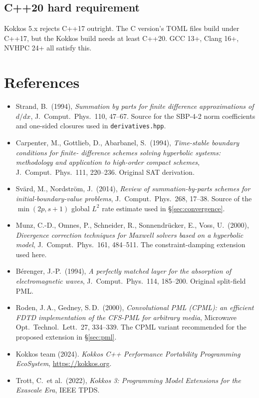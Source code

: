 \documentclass[11pt]{article}
\begin{document}
\subsection{C++20 hard requirement}

Kokkos 5.x rejects C++17 outright.  The C version's TOML files
build under C++17, but the Kokkos build needs at least C++20.
GCC 13+, Clang 16+, NVHPC 24+ all satisfy this.

\section*{References}

\begin{itemize}[itemsep=2pt,topsep=2pt]
  \item Strand, B.\ (1994), \emph{Summation by parts for finite
        difference approximations of $d/dx$}, J.\ Comput.\ Phys.\
        110, 47--67.  Source for the SBP-4-2 norm coefficients
        and one-sided closures used in \texttt{derivatives.hpp}.
  \item Carpenter, M., Gottlieb, D., Abarbanel, S.\ (1994),
        \emph{Time-stable boundary conditions for finite-
        difference schemes solving hyperbolic systems: methodology
        and application to high-order compact schemes},
        J.\ Comput.\ Phys.\ 111, 220--236.  Original SAT
        derivation.
  \item Svärd, M., Nordström, J.\ (2014), \emph{Review of
        summation-by-parts schemes for initial-boundary-value
        problems}, J.\ Comput.\ Phys.\ 268, 17--38.  Source of the
        $\min(2p, s+1)$ global $L^2$ rate estimate used in
        \S\ref{sec:convergence}.
  \item Munz, C.-D., Omnes, P., Schneider, R., Sonnendrücker, E.,
        Voss, U.\ (2000), \emph{Divergence correction techniques
        for Maxwell solvers based on a hyperbolic model},
        J.\ Comput.\ Phys.\ 161, 484--511.  The constraint-damping
        extension used here.
  \item Bérenger, J.-P.\ (1994), \emph{A perfectly matched layer
        for the absorption of electromagnetic waves},
        J.\ Comput.\ Phys.\ 114, 185--200.  Original split-field
        PML.
  \item Roden, J.\,A., Gedney, S.\,D.\ (2000), \emph{Convolutional
        PML (CPML): an efficient FDTD implementation of the
        CFS-PML for arbitrary media},
        Microwave Opt.\ Technol.\ Lett.\ 27, 334--339.  The CPML
        variant recommended for the proposed extension in
        \S\ref{sec:pml}.
  \item Kokkos team (2024). \emph{Kokkos C++ Performance
        Portability Programming EcoSystem},
        \url{https://kokkos.org}.
  \item Trott, C.\ et al.\ (2022), \emph{Kokkos 3: Programming
        Model Extensions for the Exascale Era}, IEEE TPDS.
\end{itemize}
\end{document}
